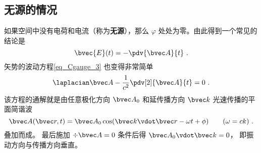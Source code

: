 \subsection{无源的情况}

如果空间中没有电荷和电流（称为\textbf{无源}），那么 $\varphi$ 处处为零。由此得到一个常见的结论是
\begin{equation}\label{eq_Cgauge_2}
\bvec {E}(t) = -\pdv{\bvec A}{t}~.
\end{equation}
矢势的波动方程\autoref{eq_Cgauge_3} 也变得非常简单
\begin{equation}
\laplacian \bvec A - \frac{1}{c^2} \pdv[2]{\bvec A}{t} = 0~.
\end{equation}
该方程的通解就是由任意极化方向 $\bvec A_0$ 和延传播方向 $\bvec k$ 光速传播的平面简谐波
\begin{equation}
\bvec A(\bvec r, t) = \bvec A_0 \cos(\bvec k \vdot \bvec r - \omega t + \phi) \qquad (\omega = ck)~.
\end{equation}
叠加而成。 最后施加 $\div \bvec A = 0$ 条件后得 $\bvec A_0 \vdot \bvec k = 0$， 即振动方向与传播方向垂直。
